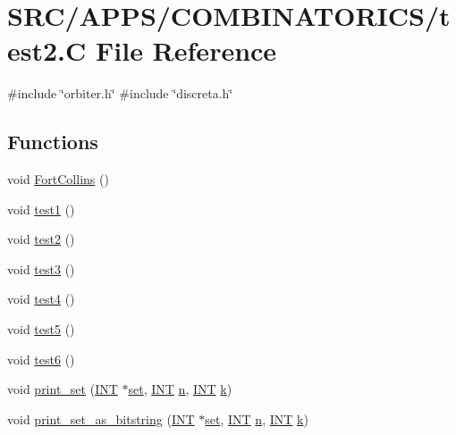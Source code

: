 \hypertarget{test2_8_c}{}\section{S\+R\+C/\+A\+P\+P\+S/\+C\+O\+M\+B\+I\+N\+A\+T\+O\+R\+I\+C\+S/test2.C File Reference}
\label{test2_8_c}
{\ttfamily \#include \char`\"{}orbiter.\+h\char`\"{}}\newline
{\ttfamily \#include \char`\"{}discreta.\+h\char`\"{}}\newline
\subsection*{Functions}
\begin{DoxyCompactItemize}
\item 
void \mbox{\hyperlink{test2_8_c_a538294936b938a17217afb60c01960c0}{Fort\+Collins}} ()
\item 
void \mbox{\hyperlink{test2_8_c_a1440a7779ac56f47a3f355ce4a8c7da0}{test1}} ()
\item 
void \mbox{\hyperlink{test2_8_c_a0283886819c7c140a023582b7269e2d0}{test2}} ()
\item 
void \mbox{\hyperlink{test2_8_c_a6d0455dd5c30adda100e95f0423c786e}{test3}} ()
\item 
void \mbox{\hyperlink{test2_8_c_a327d8cef466a7560ead5eb3995c0cbae}{test4}} ()
\item 
void \mbox{\hyperlink{test2_8_c_a8e1be3038bbc558f32a409f076126c33}{test5}} ()
\item 
void \mbox{\hyperlink{test2_8_c_a9725331980ffa46dc478f6728c4e57ce}{test6}} ()
\item 
void \mbox{\hyperlink{test2_8_c_a237e0c079f87580d6f54bcb35465dec0}{print\+\_\+set}} (\mbox{\hyperlink{galois_8h_a09fddde158a3a20bd2dcadb609de11dc}{I\+NT}} $\ast$\mbox{\hyperlink{nauty_8h_a9690bea211101f22a5e154087590c3da}{set}}, \mbox{\hyperlink{galois_8h_a09fddde158a3a20bd2dcadb609de11dc}{I\+NT}} \mbox{\hyperlink{simeon_8_c_a7f2cd26777ce0ff3fdaf8d02aacbddfb}{n}}, \mbox{\hyperlink{galois_8h_a09fddde158a3a20bd2dcadb609de11dc}{I\+NT}} \mbox{\hyperlink{simeon_8_c_a43fa990200c3ddd47c35f151bd4d66bf}{k}})
\item 
void \mbox{\hyperlink{test2_8_c_a0adced9f033d150a230473be7db95be3}{print\+\_\+set\+\_\+as\+\_\+bitstring}} (\mbox{\hyperlink{galois_8h_a09fddde158a3a20bd2dcadb609de11dc}{I\+NT}} $\ast$\mbox{\hyperlink{nauty_8h_a9690bea211101f22a5e154087590c3da}{set}}, \mbox{\hyperlink{galois_8h_a09fddde158a3a20bd2dcadb609de11dc}{I\+NT}} \mbox{\hyperlink{simeon_8_c_a7f2cd26777ce0ff3fdaf8d02aacbddfb}{n}}, \mbox{\hyperlink{galois_8h_a09fddde158a3a20bd2dcadb609de11dc}{I\+NT}} \mbox{\hyperlink{simeon_8_c_a43fa990200c3ddd47c35f151bd4d66bf}{k}})

\end{DoxyCompactItemize}
